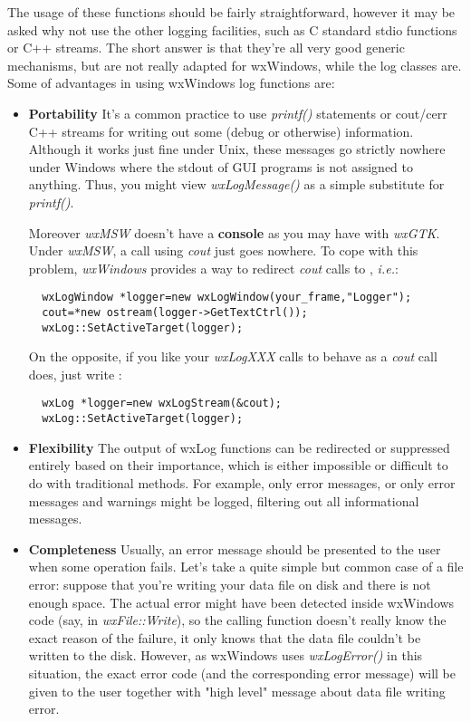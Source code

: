 The usage of these functions should be fairly straightforward, however it may
be asked why not use the other logging facilities, such as C standard stdio
functions or C++ streams. The short answer is that they're all very good
generic mechanisms, but are not really adapted for wxWindows, while the log
classes are. Some of advantages in using wxWindows log functions are:

\begin{itemize}\itemsep=0pt
\item{\bf Portability} It's a common practice to use {\it printf()} statements or
cout/cerr C++ streams for writing out some (debug or otherwise) information.
Although it works just fine under Unix, these messages go strictly nowhere
under Windows where the stdout of GUI programs is not assigned to anything.
Thus, you might view {\it wxLogMessage()} as a simple substitute for {\it
printf()}.

Moreover {\it wxMSW} doesn't have a {\bf console} as you may have with {\it
  wxGTK}. Under {\it wxMSW}, a call using {\it cout} just goes nowhere. To
cope with this problem, {\it wxWindows} provides a way to redirect {\it cout}
calls to , {\it i.e.}:
{\small
\begin{verbatim}
  wxLogWindow *logger=new wxLogWindow(your_frame,"Logger");
  cout=*new ostream(logger->GetTextCtrl());
  wxLog::SetActiveTarget(logger);
\end{verbatim}
}
On the opposite, if you like your {\it wxLogXXX} calls to behave as a {\it cout} 
call does, just write :
{\small
\begin{verbatim}
  wxLog *logger=new wxLogStream(&cout);
  wxLog::SetActiveTarget(logger);
\end{verbatim}
}
\item{\bf Flexibility} The output of wxLog functions can be redirected or
suppressed entirely based on their importance, which is either impossible or
difficult to do with traditional methods. For example, only error messages, or
only error messages and warnings might be logged, filtering out all
informational messages.
\item{\bf Completeness} Usually, an error message should be presented to the user
when some operation fails. Let's take a quite simple but common case of a file
error: suppose that you're writing your data file on disk and there is not
enough space. The actual error might have been detected inside wxWindows code
(say, in {\it wxFile::Write}), so the calling function doesn't really know the
exact reason of the failure, it only knows that the data file couldn't be
written to the disk. However, as wxWindows uses {\it wxLogError()} in this
situation, the exact error code (and the corresponding error message) will be
given to the user together with "high level" message about data file writing
error.
\end{itemize}

